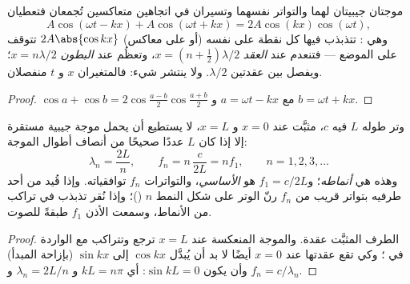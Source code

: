 \begin{theorem}\label{thm:b1:wave-propagation:standing}
موجتان جيبيتان لهما  والتواتر نفسهما وتسيران في
اتجاهين متعاكسين تُجمعان فتعطيان
\[
A\cos(\omega t - kx) + A\cos(\omega t + kx) = 2A\cos(kx)\cos(\omega t),
\]
وهي \emph{}: تتذبذب فيها كل نقطة على  نفسه (أو على
 معاكس)  $2A\abs{\cos kx}$ تتوقف على الموضع ---
فتنعدم عند \emph{العقد} $x = (n + \tfrac12)\lambda/2$، وتعظُم عند
\emph{البطون} $x = n\lambda/2$؛ ويفصل بين عقدتين $\lambda/2$. ولا ينتشر
شيء: فالمتغيران $x$ و $t$ منفصلان.
\end{theorem}

\begin{proof}
$\cos a + \cos b = 2\cos\frac{a - b}{2}\cos\frac{a + b}{2}$ مع
$a = \omega t - kx$ و $b = \omega t + kx$.
\end{proof}

\begin{proposition}\label{prop:b1:wave-propagation:modes}
وتر طوله $L$  فيه $c$، مثبَّت عند $x = 0$ و $x = L$، لا
يستطيع أن يحمل موجة جيبية مستقرة إلا إذا كان $L$ عددًا صحيحًا من
أنصاف أطوال الموجة:
\[
\lambda_n = \frac{2L}{n}, \qquad f_n = n\,\frac{c}{2L} = n f_1,
\qquad n = 1, 2, 3, \dots
\]
وهذه هي \emph{أنماطه}؛ و$f_1 = c/2L$ هو \emph{الأساسي}،
والتواترات $f_n$ توافقياته. وإذا قُيد من أحد طرفيه بتواتر قريب من
$f_n$ رنّ الوتر على شكل النمط $n$ ()؛
وإذا نُقر تذبذب في تراكب من الأنماط، وسمعت
الأذن $f_1$ طبقةً للصوت.
\end{proposition}

\begin{proof}
الطرف المثبَّت عقدة. والموجة المنعكسة عند $x = L$ ترجع
وتتراكب مع الواردة في ؛ وكي تقع عقدتها
عند $x = 0$ أيضًا لا بد أن يُبدَّل $\cos kx$ إلى $\sin kx$ (بإزاحة
المبدأ) وأن يكون $\sin kL = 0$: أي $kL = n\pi$ و $\lambda_n = 2L/n$ و
$f_n = c/\lambda_n$.
\end{proof}

